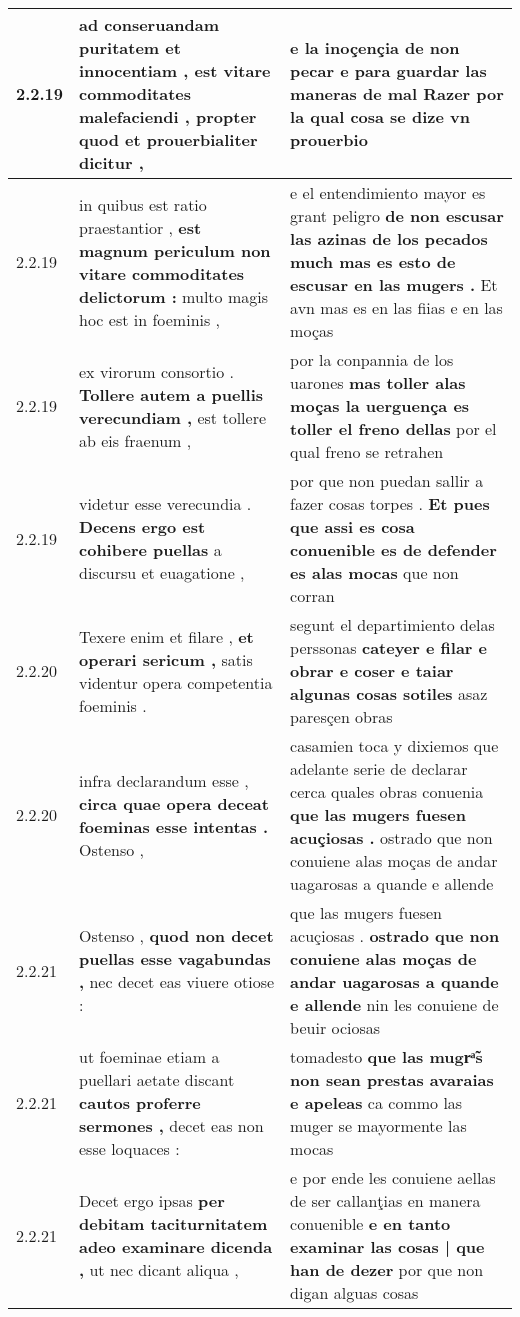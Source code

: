 \begin{tabular}{|p{1cm}|p{6.5cm}|p{6.5cm}|}
2.2.19 & ad conseruandam puritatem et innocentiam , \textbf{ est vitare commoditates malefaciendi , } propter quod et prouerbialiter dicitur , & e la inoçençia de non pecar \textbf{ e para guardar las maneras de mal Razer } por la qual cosa se dize vn prouerbio \\\hline
2.2.19 & in quibus est ratio praestantior , \textbf{ est magnum periculum non vitare commoditates delictorum : } multo magis hoc est in foeminis , & e el entendimiento mayor es grant peligro \textbf{ de non escusar las azinas de los pecados much mas es esto de escusar en las mugers . } Et avn mas es en las fiias e en las moças \\\hline
2.2.19 & ex virorum consortio . \textbf{ Tollere autem a puellis verecundiam , } est tollere ab eis fraenum , & por la conpannia de los uarones \textbf{ mas toller alas moças la uerguença es toller el freno dellas } por el qual freno se retrahen \\\hline
2.2.19 & videtur esse verecundia . \textbf{ Decens ergo est cohibere puellas } a discursu et euagatione , & por que non puedan sallir a fazer cosas torpes . \textbf{ Et pues que assi es cosa conuenible es de defender es alas mocas } que non corran \\\hline
2.2.20 & Texere enim et filare , \textbf{ et operari sericum , } satis videntur opera competentia foeminis . & segunt el departimiento delas perssonas \textbf{ cateyer e filar e obrar e coser e taiar algunas cosas sotiles } asaz paresçen obras \\\hline
2.2.20 & infra declarandum esse , \textbf{ circa quae opera deceat foeminas esse intentas . } Ostenso , & casamien toca y dixiemos que adelante serie de declarar cerca quales obras conuenia \textbf{ que las mugers fuesen acuçiosas . } ostrado que non conuiene alas moças de andar uagarosas a quande e allende \\\hline
2.2.21 & Ostenso , \textbf{ quod non decet puellas esse vagabundas , } nec decet eas viuere otiose : & que las mugers fuesen acuçiosas . \textbf{ ostrado que non conuiene alas moças de andar uagarosas a quande e allende } nin les conuiene de beuir ociosas \\\hline
2.2.21 & ut foeminae etiam a puellari aetate discant \textbf{ cautos proferre sermones , } decet eas non esse loquaces : & tomadesto \textbf{ que las mugrͣ̃s non sean prestas avaraias e apeleas } ca commo las muger se mayormente las mocas \\\hline
2.2.21 & Decet ergo ipsas \textbf{ per debitam taciturnitatem adeo examinare dicenda , } ut nec dicant aliqua , & e por ende les conuiene aellas de ser callanţias en manera conuenible \textbf{ e en tanto examinar las cosas | que han de dezer } por que non digan alguas cosas \\\hline

\end{tabular}
